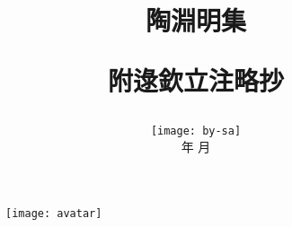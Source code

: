 \documentclass[10pt, a5paper]{ctexbook}
\title{\ziju{0.15}
    \textbf{陶淵明集}

    {\small 附逯欽立注略抄}
}
\author{}
\date{
    \vspace{\fill}
    \texttt{[image: by-sa]}\\
    \footnotesize \the\year 年 \the\month 月
}
\begin{document}
\maketitle
\thispagestyle{empty}

\begin{figure}[t]
    \texttt{[image: avatar]}
    \centering
\end{figure}

\frontmatter
\tableofcontents

\mainmatter

\let\cleardoublepage\relax

\let\cleardoublepage\relax

\let\cleardoublepage\relax

\let\cleardoublepage\relax

\let\cleardoublepage\relax

\let\cleardoublepage\relax

\end{document}
